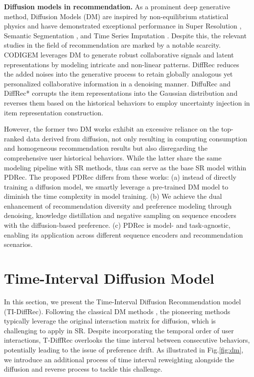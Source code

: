 \documentclass[letterpaper]{article} %
\begin{document}
\noindent
\textbf{Diffusion models in recommendation.}
As a prominent deep generative method, Diffusion Models (DM) are inspired by non-equilibrium statistical physics and hasve demonstrated exceptional performance in Super Resolution \cite{SR_v1, SR_v2}, Semantic Segmentation \cite{SS_v1}, and Time Series Imputation \cite{TSL_v2}. Despite this, the relevant studies in the field of recommendation are marked by a notable scarcity. CODIGEM \cite{CODIGEM} leverages DM to generate robust collaborative signals and latent representations by modeling intricate and non-linear patterns. DiffRec \cite{DiffRec} reduces the added noises into the generative process to retain globally analogous yet personalized collaborative information in a denoising manner. DiffuRec \cite{DiffuRec} and DiffRec* \cite{DiffRec*} corrupts the item representations into the Gaussian distribution and reverses them based on the historical behaviors to employ uncertainty injection in item representation construction. 

However, the former two DM works exhibit an excessive reliance on the top-ranked data derived from diffusion, not only resulting in computing consumption and homogeneous recommendation results but also disregarding the comprehensive user historical behaviors. 
While the latter share the same modeling pipeline with SR methods, thus can serve as the base SR model within PDRec. The proposed PDRec differs from these works: (a) instead of directly training a diffusion model, we smartly leverage a pre-trained DM model to diminish the time complexity in model training. (b) We achieve the dual enhancement of recommendation diversity and preference modeling through denoising, knowledge distillation and negative sampling on sequence encoders with the diffusion-based preference. (c) PDRec is model- and task-agnostic, enabling its application across different sequence encoders and recommendation scenarios.



\section{Time-Interval Diffusion Model}
\label{sec.TI-DiffRec}
In this section, we present the Time-Interval Diffusion Recommendation model (TI-DiffRec). Following the classical DM methods \cite{DDPM, IDDPM}, the pioneering methods \cite{CODIGEM, DiffRec} typically leverage the original interaction matrix for diffusion, which is challenging to apply in SR. Despite incorporating the temporal order of user interactions, T-DiffRec \cite{DiffRec} overlooks the time interval between consecutive behaviors, potentially leading to the issue of preference drift. As illustrated in Fig.\ref{fig:dm}, we introduce an additional process of time interval reweighting alongside the diffusion and reverse process to tackle this challenge.
\end{document}
